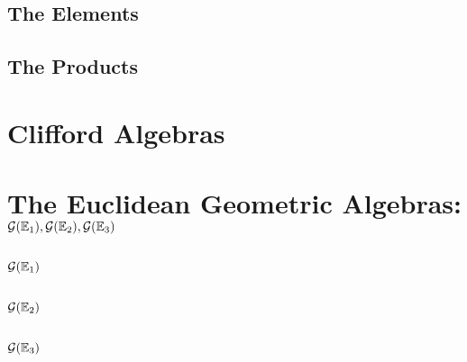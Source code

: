 \subsection{The Elements}

\subsection{The Products}

\section{Clifford Algebras}

\section{The Euclidean Geometric Algebras: $\mathcal{G}(\mathbb{E}_1), \mathcal{G}(\mathbb{E}_2), \mathcal{G}(\mathbb{E}_3)$ }

\subsection{$\mathcal{G}(\mathbb{E}_1)$}

\subsection{$\mathcal{G}(\mathbb{E}_2)$}

\subsection{$\mathcal{G}(\mathbb{E}_3)$}

